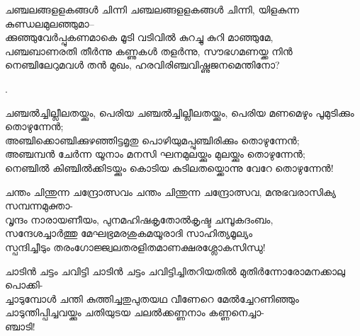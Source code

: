 \begin{enumerate}

\begin{slokam}{\VKm}{\UN}{ചഞ്ചലങ്ങളളകങ്ങൾ ചിന്നി}
ചഞ്ചലങ്ങളളകങ്ങൾ ചിന്നി, യിളകുന്ന കുണ്ഡലമുലഞ്ഞുമാ--\\
ക്കുഞ്ഞുവേർപ്പുകണമാകെ മൂടി വടിവിൽ കുറച്ചു കുറി മാഞ്ഞുമേ,\\
പഞ്ചബാണരതി തീർന്നു കണ്ണുകൾ തളർന്നു, സൗഭഗമണയ്ക്ക നിൻ\\
നെഞ്ചിലേറുമവൾ തൻ മുഖം, ഹരവിരിഞ്ചവിഷ്ണുജനമെന്തിനോ?
\end{slokam}


. 

\begin{slokam}{\VSr}{\CN}{ചഞ്ചൽച്ചില്ലീലതയ്ക്കും, പെരിയ}
ചഞ്ചൽച്ചില്ലീലതയ്ക്കും, പെരിയ മണമെഴും പൂമുടിക്കും തൊഴുന്നേൻ;\\
അഞ്ചിക്കൊഞ്ചിക്കുഴഞ്ഞിട്ടമൃതു പൊഴിയുമപ്പുഞ്ചിരിക്കും തൊഴുന്നേൻ;\\
അഞ്ചമ്പൻ ചേർന്ന യൂനാം മനസി ഘനമുലയ്ക്കും മുലയ്ക്കും തൊഴുന്നേൻ;\\
നെഞ്ചിൽ കിഞ്ചിൽക്കിടയ്ക്കും കൊടിയ കുടിലതയ്ക്കൊന്നു വേറേ തൊഴുന്നേൻ!
\end{slokam}


\begin{slokam}{\VSr}{\VKG}{ചന്തം ചിന്തുന്ന ചന്ദ്രോത്സവം}
ചന്തം ചിന്തുന്ന ചന്ദ്രോത്സവ, മനുഭവരാസിക്യ സമ്പന്നമുക്താ-\\
വൃന്ദം നാരായണീയം, പുനമഹിഷകൃതോൽകൃഷ്ട ചമ്പൂകദംബം,\\
സന്ദേശച്ചാർത്തു മേഘഭ്രമരശുകമയൂരാദി സാഹിത്യമൂല്യം\\
സ്പന്ദിച്ചീടും തരംഗോജ്ജ്വലതരളിതമാണക്ഷരശ്ലോകസിന്ധു!
\end{slokam}



\begin{slokam}{\VSr}{\VenM}{ചാടിൻ ചട്ടം ചവിട്ടി}
ചാടിൻ ചട്ടം ചവിട്ടിച്ചിതറിയതിൽ മുതിർന്നോരോമനക്കാലു പൊക്കി-\\
ച്ചാടുമ്പോള്‍ ചന്തി കുത്തിച്ചതുപുതയഥ വീണേറെ മേൽച്ചേറണിഞ്ഞും\\
ചാടുന്തിപ്പിച്ചവയ്ക്കും ചതിയുടയ ചലൽക്കണ്ണനാം കണ്ണനെച്ചാ-\\
ഞ്ചാടി!
\end{slokam}




\end{enumerate}
